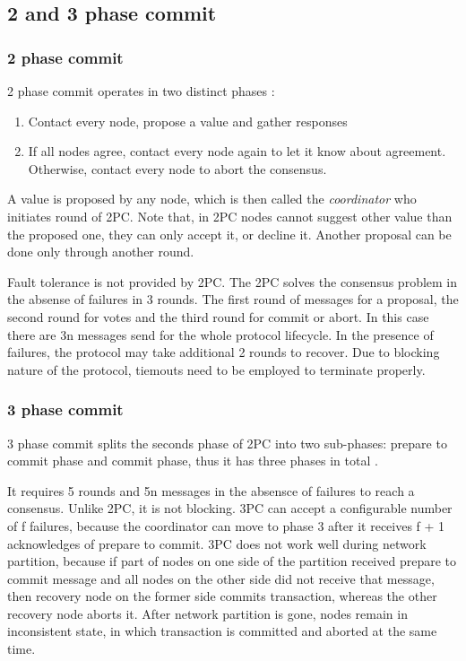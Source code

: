 \documentclass[runningheads,a4paper]{llncs}
\begin{document}
\subsection{2 and 3 phase commit}
\subsubsection{2 phase commit}
2 phase commit operates in two distinct phases \cite{Bernstein:1987}: 
\begin{enumerate} 
	\item Contact every node, propose a value and gather responses 
	\item If all nodes agree, contact every node again to let it know about 
	agreement. Otherwise, contact every node to abort the consensus. 
\end{enumerate}

A value is proposed by any node, which is then called the \emph{coordinator} who initiates round of 2PC. Note that, in 2PC nodes cannot suggest other value than the proposed one, they can only accept it, or decline it. Another proposal can be done only through another round. 

Fault tolerance is not provided by 2PC. The 2PC solves the consensus problem in the absense of failures in 3 rounds. The first  round of messages for a proposal, the second round for votes and the third round for commit or abort. In this case there are 3n messages send for the whole protocol lifecycle. In the presence of failures,  the protocol may take additional 2 rounds to recover. Due to blocking nature of the protocol, tiemouts  need to be employed to terminate properly.

\subsubsection{3 phase commit}

3 phase commit splits the seconds phase of 2PC into two sub-phases: prepare to commit phase and commit phase, thus it has three phases in total \cite{Bernstein:1987}.

It requires 5 rounds and 5n messages in the absensce of failures to reach a consensus.  Unlike 2PC, it is not blocking. 3PC can accept a configurable number of f failures, because the coordinator can move to phase 3 after it receives f + 1 acknowledges of prepare to commit. 3PC does not work well during network partition, because if part of nodes on one side of the partition received prepare to commit message and all nodes on the other side did not receive that message, then recovery node on the former side commits transaction, whereas the other recovery node aborts it. After network partition is gone, nodes remain in inconsistent state, in which transaction is committed and aborted at the same time.
\end{document}
